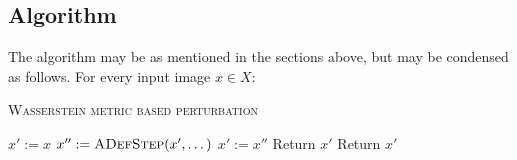 \documentclass[]{article}
\begin{document}
\subsection{Algorithm}
The algorithm may be as mentioned in the sections above, but may be condensed as follows. For every input image $x\in X$:

\begin{algorithm}
	\caption{\textsc{Wasserstein metric based perturbation}}
	\begin{algorithmic}[1]
		
		\State $x':=x$ 
			\State $x'':=\textsc{ADefStep}(x',\dots)$
			\State $x':=x''$
				\State Return $x'$
			\EndIf
			\Else
			\State Return $x'$
			\EndIf
		\EndWhile
	
		\EndProcedure

	\end{algorithmic}
\end{algorithm}
\end{document}
